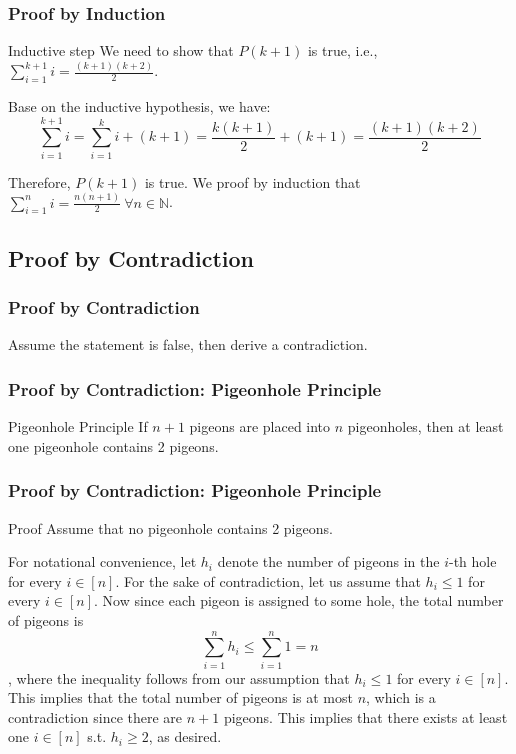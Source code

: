 \documentclass[t]{beamer}
\begin{document}
            \begin{frame}
                \frametitle{Proof by Induction}
                \begin{block} {Inductive step}
                    We need to show that $P(k+1)$ is true, i.e., $\sum_{i = 1}^{k+1} i = \frac{(k+1)(k+2)}{2}$.

                    \bigskip
                    Base on the inductive hypothesis, we have:
                    \[\sum _{i = 1}^{k+1} i = \sum _{i = 1}^{k} i + (k+1) = \frac{k(k+1)}{2} + (k+1) = \frac{(k+1)(k+2)}{2}\]

                    \bigskip
                    Therefore, $P(k+1)$ is true. We proof by induction that $\sum_{i = 1}^{n} i = \frac{n(n+1)}{2}\ \forall n \in \mathbb{N}$.
                \end{block}
            \end{frame}

            \subsection{Proof by Contradiction}
                \begin{frame}
                    \frametitle{Proof by Contradiction}
                    Assume the statement is false, then derive a contradiction.
                \end{frame}

                \begin{frame}
                    \frametitle{Proof by Contradiction: Pigeonhole Principle}
                    \begin{block}{Pigeonhole Principle}
                        If $n+1$ pigeons are placed into $n$ pigeonholes, then at least one pigeonhole contains 2 pigeons.
                    \end{block}
                \end{frame}

            \begin{frame}
                \frametitle{Proof by Contradiction: Pigeonhole Principle }
                \begin{block}{Proof}
                    Assume that no pigeonhole contains 2 pigeons.

                    \bigskip
                    For notational convenience, let $h_i$ denote the number of pigeons in the $i$-th hole for every $i \in [n]$. For the sake of contradiction, 
                    let us assume that $h_i \leq 1$ for every $i \in [n]$. Now since each pigeon is assigned to some hole, 
                    the total number of pigeons is \[\sum_{i=1}^{n} h_i \leq \sum_{i=1}^{n} 1 = n\], where the inequality follows from our assumption that $h_i \leq 1$ for every $i \in [n]$. 
                    This implies that the total number of pigeons is at most $n$, which is a contradiction since there are $n+1$ pigeons. 
                    This implies that there exists at least one $i \in [n]$ s.t. $h_i \geq 2$, as desired.
                \end{block}
            \end{frame}
\end{document}
